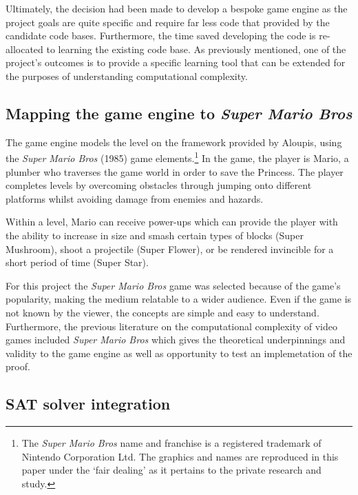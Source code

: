 \documentclass[11pt, a4paper, oneside]{report} %
\begin{document}
Ultimately, the decision had been made to develop a bespoke game engine as the
project goals are quite specific and require far less code that provided by the
candidate code bases. Furthermore, the time saved developing the code is re-
allocated to learning the existing code base. As previously mentioned, one of
the project's outcomes is to provide a specific learning tool that can be
extended for the purposes of understanding computational complexity.

\subsection{Mapping the game engine to \textit{Super Mario Bros}}

The game engine models the level on the framework provided by Aloupis, using the
\textit{Super Mario Bros} (1985) game elements.\footnote{ The \textit{Super Mario
Bros} name and franchise is a registered trademark of Nintendo Corporation
Ltd. The graphics and names are reproduced in this paper under the `fair
dealing' as it pertains to the private research and study.} In the game, the
player is Mario, a plumber who traverses the game world in order to save the
Princess. The player completes levels by overcoming obstacles through jumping
onto different platforms whilst avoiding damage from enemies and hazards.

Within a level, Mario can receive power-ups which can provide the player with
the ability to increase in size and smash certain types of blocks (Super
Mushroom), shoot a projectile (Super Flower), or be rendered invincible for a
short period of time (Super Star).


For this project the \textit{Super Mario Bros} game was selected because of the
game's popularity, making the medium relatable to a wider audience. Even if the
game is not known by the viewer, the concepts are simple and easy to understand.
Furthermore, the previous literature on the computational complexity of video
games included \textit{Super Mario Bros} which gives the theoretical
underpinnings and validity to the game engine as well as opportunity to test an
implemetation of the proof.

\subsection{SAT solver integration}
\end{document}

